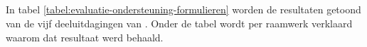 % 
% 
% 

\subsection{}
\label{sec:evaluatie-ondersteuning-formulieren}

In tabel \ref{tabel:evaluatie-ondersteuning-formulieren} worden de resultaten getoond van de vijf deeluitdagingen van .
Onder de tabel wordt per raamwerk verklaard waarom dat resultaat werd behaald.

